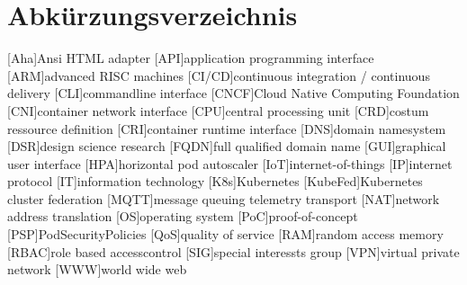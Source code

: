 \documentclass[MIC,Master,english]{twbook}%
\providecommand\listacroname{}
\renewcommand\listacroname{List of Abbreviations}
\renewcommand\listacroname{Abkürzungsverzeichnis}
\begin{document}
\chapter*{\listacroname}
\begin{acronym}[XXXXX]
    [Aha]{Ansi HTML adapter}
    [API]{application programming interface}
    [ARM]{advanced RISC machines}
    [CI/CD]{continuous integration / continuous delivery}
    [CLI]{commandline interface}
    [CNCF]{Cloud Native Computing Foundation}
    [CNI]{container network interface}
    [CPU]{central processing unit}
    [CRD]{costum ressource definition}
    [CRI]{container runtime interface}
    [DNS]{domain namesystem}
    [DSR]{design science research}
    [FQDN]{full qualified domain name}
    [GUI]{graphical user interface}
    [HPA]{horizontal pod autoscaler}
    [IoT]{internet-of-things}
    [IP]{internet protocol}
    [IT]{information technology}
    [K8s]{Kubernetes}
    [KubeFed]{Kubernetes cluster federation}
    [MQTT]{message queuing telemetry transport}
    [NAT]{network address translation}
    [OS]{operating system}
    [PoC]{proof-of-concept}
    [PSP]{PodSecurityPolicies}
    [QoS]{quality of service}
    [RAM]{random access memory}
    [RBAC]{role based accesscontrol}
    [SIG]{special interessts group}
    [VPN]{virtual private network}
    [WWW]{world wide web}
\end{acronym}

%
%
\clearpage
\appendix
\end{document}
